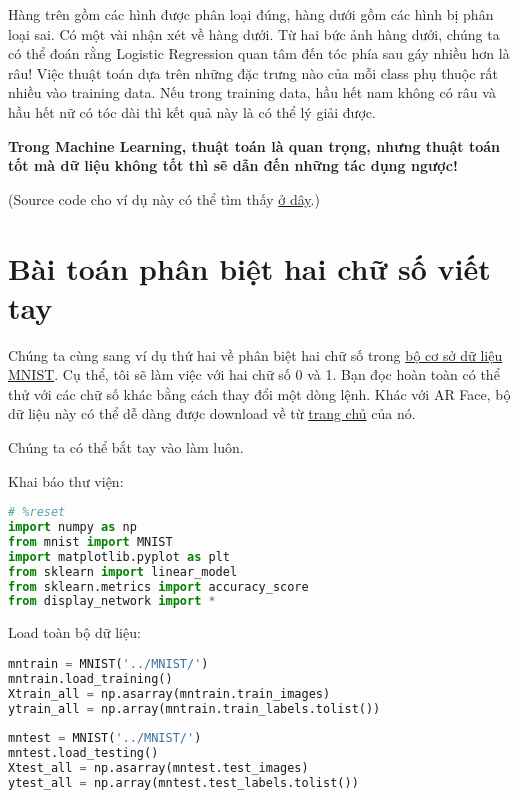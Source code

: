 Hàng trên gồm các hình được phân loại đúng, hàng dưới gồm các hình bị phân loại sai. Có một vài nhận xét về hàng dưới. Từ hai bức ảnh hàng dưới, chúng ta có thể đoán rằng Logistic Regression quan tâm đến tóc phía sau gáy nhiều hơn là râu! Việc thuật toán dựa trên những đặc trưng nào của mỗi class phụ thuộc rất nhiều vào training data. Nếu trong training data, hầu hết nam không có râu và hầu hết nữ có tóc dài thì kết quả này là có thể lý giải được.  
 
\textbf{Trong Machine Learning, thuật toán là quan trọng, nhưng thuật toán tốt mà dữ liệu không tốt thì sẽ dẫn đến những tác dụng ngược!} 
 
(Source code cho ví dụ này có thể tìm thấy \href{http://machinelearningcoban.com/assets/LogRegs/ARgender.py}{ở dây}.) 
 
\section{Bài toán phân biệt hai chữ số viết tay }
Chúng ta cùng sang ví dụ thứ hai về phân biệt hai chữ số trong \href{http://machinelearningcoban.com/2017/01/04/kmeans2/#bo-co-so-du-lieu-mnist}{bộ cơ sở dữ liệu MNIST}. Cụ thể, tôi sẽ làm việc với hai chữ số 0 và 1. Bạn đọc hoàn toàn có thể thử với các chữ số khác bằng cách thay đổi một dòng lệnh. Khác với AR Face, bộ dữ liệu này có thể dễ dàng được download về từ \href{http://yann.lecun.com/exdb/mnist/}{trang chủ} của nó. 
 
Chúng ta có thể bắt tay vào làm luôn.  
 
Khai báo thư viện: 
 
\begin{lstlisting}[language=Python]
# %reset 
import numpy as np  
from mnist import MNIST 
import matplotlib.pyplot as plt 
from sklearn import linear_model 
from sklearn.metrics import accuracy_score 
from display_network import * 
\end{lstlisting}
 
Load toàn bộ dữ liệu: 
 
\begin{lstlisting}[language=Python]
mntrain = MNIST('../MNIST/') 
mntrain.load_training() 
Xtrain_all = np.asarray(mntrain.train_images) 
ytrain_all = np.array(mntrain.train_labels.tolist()) 
 
mntest = MNIST('../MNIST/') 
mntest.load_testing() 
Xtest_all = np.asarray(mntest.test_images) 
ytest_all = np.array(mntest.test_labels.tolist()) 
\end{lstlisting}
 
